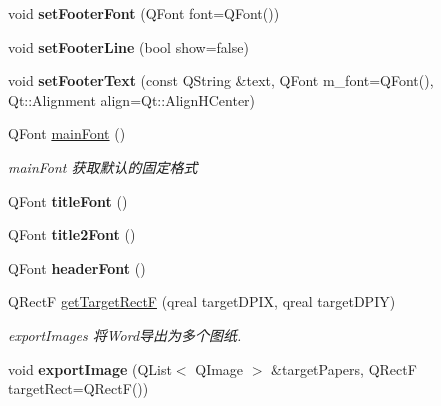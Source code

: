 \begin{DoxyCompactItemize}
\item 
\mbox{\label{class_q_qt_word_a63fa95fbc3e2ffaa40515048b9ca0a83}} 
void {\bfseries set\+Footer\+Font} (Q\+Font font=Q\+Font())
\item 
\mbox{\label{class_q_qt_word_a32e4b27c356ae2a241b044ca672d34bd}} 
void {\bfseries set\+Footer\+Line} (bool show=false)
\item 
\mbox{\label{class_q_qt_word_a2d9deb374f7648617c0d90af0ce16f0e}} 
void {\bfseries set\+Footer\+Text} (const Q\+String \&text, Q\+Font m\+\_\+font=Q\+Font(), Qt\+::\+Alignment align=Qt\+::\+Align\+H\+Center)
\item 
\mbox{\label{class_q_qt_word_a02130ca6cfa6675c60cde8134af8f7b9}} 
Q\+Font \mbox{\hyperlink{class_q_qt_word_a02130ca6cfa6675c60cde8134af8f7b9}{main\+Font}} ()
\begin{DoxyCompactList}\small\item\em main\+Font 获取默认的固定格式 \end{DoxyCompactList}\item 
\mbox{\label{class_q_qt_word_a9a8f8d1087b636a745dcfe75989829b1}} 
Q\+Font {\bfseries title\+Font} ()
\item 
\mbox{\label{class_q_qt_word_a51405ec0dc6ebf8d1a322953e10b4e3b}} 
Q\+Font {\bfseries title2\+Font} ()
\item 
\mbox{\label{class_q_qt_word_aa40d6efb6fd37d8e9ed8827b834c7ce6}} 
Q\+Font {\bfseries header\+Font} ()
\item 
\mbox{\label{class_q_qt_word_aec29996fc37ae81fd3feee12284142d5}} 
Q\+RectF \mbox{\hyperlink{class_q_qt_word_aec29996fc37ae81fd3feee12284142d5}{get\+Target\+RectF}} (qreal target\+D\+P\+IX, qreal target\+D\+P\+IY)
\begin{DoxyCompactList}\small\item\em export\+Images 将\+Word导出为多个图纸. \end{DoxyCompactList}\item 
\mbox{\label{class_q_qt_word_a7f9b45594351de8fd5c3698509192cc7}} 
void {\bfseries export\+Image} (Q\+List$<$ Q\+Image $>$ \&target\+Papers, Q\+RectF target\+Rect=Q\+RectF())
\end{DoxyCompactItemize}
